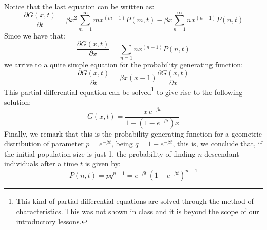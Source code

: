 Notice that the last equation can be written as:
\begin{equation}
\frac{\partial G(x,t)}{\partial t} = \beta x^2 \sum_{m=1}^{\infty} m x^{(m-1)} P(m,t) - \beta x \sum_{n=1}^{\infty}n x^{(n-1)} P(n,t)
\end{equation}
Since we have that:
\begin{equation}
\frac{\partial G(x,t)}{\partial x} = \sum_{n=1} n x^{(n-1)} P(n,t)
\end{equation}
we arrive to a quite simple equation for the probability generating function:
\begin{equation}
\label{eq:GenYule}
\frac{\partial G(x,t)}{\partial t} = \beta x (x-1) \frac{\partial G(x,t)}{\partial x}
\end{equation}
This partial differential equation can be solved\footnote{This kind of partial differential equations are solved through the method of characteristics. This was not shown in class and it is beyond the scope of our introductory lessons.} to give rise to the following solution:
\begin{equation}
G(x,t) = \frac{x \, e^{-\beta t}}{1 - (1 -e^{-\beta t})x}
\end{equation}
Finally, we remark that this is the probability generating function for a geometric distribution of parameter $p=e^{-\beta t}$, being $q=1-e^{-\beta t}$, this is, we conclude that, if the initial population size is just 1, the probability of finding $n$ descendant individuals after a time $t$ is given by:
\begin{equation}
P(n,t) = p q^{n-1} = e^{-\beta t} \, (1 - e^{-\beta t})^{n-1}
\end{equation}

